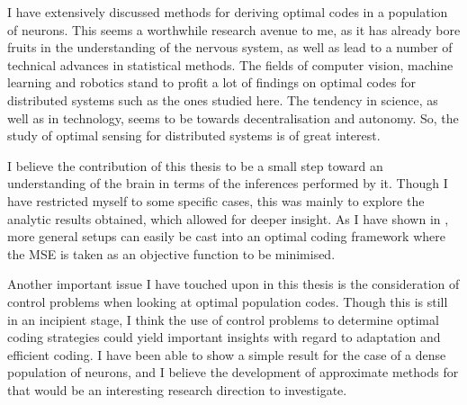 I have extensively discussed methods for deriving optimal codes in a population of neurons. This seems a worthwhile research avenue to me, as it has already bore fruits in the 
understanding of the nervous system, as well as lead to a number of technical advances in statistical methods. The fields of computer vision, machine learning and robotics stand
to profit a lot of findings on optimal codes for distributed systems such as the ones studied here. The tendency in science, as well as in technology, seems to be towards decentralisation
and autonomy. So, the study of optimal sensing for distributed systems is of great interest.\par

I believe the contribution of this thesis to be a small step toward an understanding of the brain in terms of the inferences performed by it. Though I have restricted myself to some
specific cases, this was mainly to explore the analytic results obtained, which allowed for deeper insight. As I have shown in , more general setups can easily
be cast into an optimal coding framework where the MSE is taken as an objective function to be minimised.\par

Another important issue I have touched upon in this thesis is the consideration of control problems when looking at optimal population codes. Though this is still in an incipient stage,
I think the use of control problems to determine optimal coding strategies could yield important insights with regard to adaptation and efficient coding. I have been able to show a simple
result for the case of a dense population of neurons, and I believe the development of approximate methods for that would be an interesting research direction to investigate.\par
